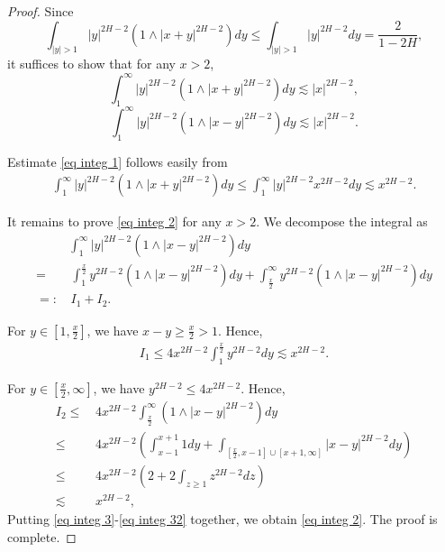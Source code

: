 \documentclass[10pt,a4paper]{amsart}
\begin{document}
\begin{proof}
Since
 \begin{equation*}
 \int_{|y|>1}|y|^{2H-2} \left(1\wedge |x+y|^{2H-2}\right)dy\le \int_{|y|>1}|y|^{2H-2}dy=\frac{2}{1-2H},
\end{equation*} 
it suffices to show that for any $x>2$,
\begin{equation}\label{eq integ 1}
\int_{1}^{\infty}|y|^{2H-2}\left(1\wedge |x+y|^{2H-2}\right)dy\lesssim   |x|^{2H-2},
\end{equation}
\begin{equation}\label{eq integ 2}
\int_{1}^{\infty}|y|^{2H-2}\left(1\wedge |x-y|^{2H-2}\right)dy \lesssim   |x|^{2H-2}.
\end{equation}

Estimate \eqref{eq integ 1} follows easily from 
\begin{align*}
\int_{1}^{\infty}|y|^{2H-2}\left(1\wedge |x+y|^{2H-2}\right) dy \le \int_{1}^{\infty}|y|^{2H-2} x^{2H-2}dy\lesssim x^{2H-2}.
\end{align*}

It remains to prove \eqref{eq integ 2}  for any $x>2$. We decompose the integral as 
\begin{equation}\label{eq integ 3}
\begin{split}
&\int_{1}^{\infty}|y|^{2H-2}\left(1\wedge |x-y|^{2H-2}\right)dy\\
 =&\, \int_{1}^{\frac{x}2}y^{2H-2}\left(1\wedge |x-y|^{2H-2}\right)dy+\int_{\frac{x}{2}}^{\infty}y^{2H-2}\left(1\wedge |x-y|^{2H-2}\right)dy  \\
 =:&\, I_1+I_2.  
\end{split}
\end{equation}

For  $y\in [1,\frac{x}2]$,  we have $x-y\ge \frac{x}{2}>1$.  Hence, 
 \begin{align}\label{eq integ 31}
{I_1}\le4 x^{2H-2}\int_1^{\frac{x}2}y^{2H-2}dy\lesssim x^{2H-2}.
\end{align}

For    $y\in [\frac{x}2,\infty]$, we have   $y^{2H-2}\le 4x^{2H-2}$.  Hence, 
\begin{equation}\label{eq integ 32}
\begin{split}
{I_2} \le &\,  4 x^{2H-2}\int_{\frac{x}2}^{\infty}\left(1\wedge |x-y|^{2H-2}\right)dy\\
\le &\, 4x^{2H-2} \left(\int_{x-1}^{x+1}1dy+\int_{[\frac{x}2,x-1]\cup [x+1,\infty]}|x-y|^{2H-2}dy\right)\\
\le &\,  4x^{2H-2}\left(2+2\int_{z\ge1} z^{2H-2}dz\right)\\
 \lesssim &\, x^{2H-2},
 \end{split}
\end{equation}
Putting \eqref{eq integ 3}-\eqref{eq integ 32} together, we obtain \eqref{eq integ 2}.
 The proof is complete.  
  \end{proof}
\end{document}
